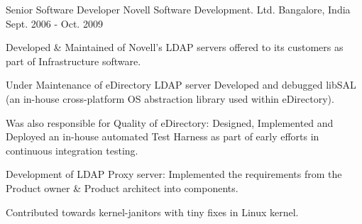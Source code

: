   \cventry
    {Senior Software Developer} %
    {Novell Software Development. Ltd.} %
    {Bangalore, India} %
    {Sept. 2006 - Oct. 2009} %
    {
      \begin{cvitems} %
      \item {Developed \& Maintained of Novell's LDAP servers offered to its customers as part of Infrastructure software.}
      \item {Under Maintenance of eDirectory LDAP server Developed and debugged libSAL (an in-house cross-platform OS abstraction library used within eDirectory).}
      \item {Was also responsible for Quality of  eDirectory: Designed, Implemented and Deployed an in-house automated Test Harness as part of early efforts in continuous integration testing.}
      \item {Development of LDAP Proxy server: Implemented the requirements from the Product owner \& Product architect into components.}
      \item {Contributed towards kernel-janitors with tiny fixes in Linux kernel.}
      \end{cvitems}
    }
